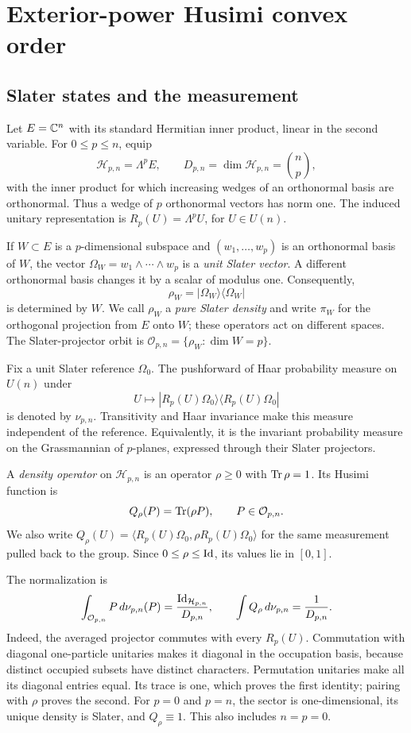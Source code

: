 \section{Exterior-power Husimi convex order}
\label{ext:section}

\subsection{Slater states and the measurement}

Let $E=\mathbb C^n$ with its standard Hermitian inner product, linear in the
second variable. For $0\le p\le n$, equip
\[
 \mathcal H_{p,n}=\Lambda^p E,
 \qquad D_{p,n}=\dim\mathcal H_{p,n}=\binom np,
\]
with the inner product for which increasing wedges of an orthonormal
basis are orthonormal. Thus a wedge of $p$ orthonormal vectors has norm
one. The induced unitary representation is
$R_p(U)=\Lambda^p U$, for $U\in U(n)$.

If $W\subset E$ is a $p$-dimensional subspace and $(w_1,\ldots,w_p)$
is an orthonormal basis of $W$, the vector
$\Omega_W=w_1\wedge\cdots\wedge w_p$ is a \emph{unit Slater vector}.
A different orthonormal basis changes it by a scalar of modulus one.
Consequently,
\[
 \rho_W=|\Omega_W\rangle\langle\Omega_W|
\]
is determined by $W$. We call $\rho_W$ a \emph{pure Slater density} and
write $\pi_W$ for the orthogonal projection from $E$ onto $W$; these
operators act on different spaces. The Slater-projector orbit is
$\mathcal O_{p,n}=\{\rho_W:\dim W=p\}$.

Fix a unit Slater reference $\Omega_0$. The pushforward of Haar
probability measure on $U(n)$ under
\[
 U\longmapsto
 |R_p(U)\Omega_0\rangle\langle R_p(U)\Omega_0|
\]
is denoted by $\nu_{p,n}$. Transitivity and Haar invariance make this
measure independent of the reference. Equivalently, it is the invariant
probability measure on the Grassmannian of $p$-planes, expressed through
their Slater projectors.

A \emph{density operator} on $\mathcal H_{p,n}$ is an operator
$\rho\ge0$ with $\operatorname{Tr}\rho=1$. Its Husimi function is
\begin{equation}
 Q_\rho(P)=\operatorname{Tr}(\rho P),\qquad P\in\mathcal O_{p,n}.
 \label{ext:husimi}
\end{equation}
We also write
$Q_\rho(U)=\langle R_p(U)\Omega_0,\rho R_p(U)\Omega_0\rangle$
for the same measurement pulled back to the group. Since
$0\le\rho\le\mathrm{Id}$, its values lie in $[0,1]$.

The normalization is
\begin{equation}
 \int_{\mathcal O_{p,n}}P\,d\nu_{p,n}(P)
 =\frac{\mathrm{Id}_{\mathcal H_{p,n}}}{D_{p,n}},
 \qquad
 \int Q_\rho\,d\nu_{p,n}=\frac1{D_{p,n}}.
 \label{ext:resolution}
\end{equation}
Indeed, the averaged projector commutes with every $R_p(U)$.
Commutation with diagonal one-particle unitaries makes it diagonal in
the occupation basis, because distinct occupied subsets have distinct
characters. Permutation unitaries make all its diagonal entries equal.
Its trace is one, which proves the first identity; pairing with $\rho$
proves the second. For $p=0$ and $p=n$, the sector is one-dimensional,
its unique density is Slater, and $Q_\rho\equiv1$. This also includes
$n=p=0$.

